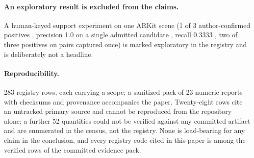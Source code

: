 \paragraph{An exploratory result is excluded from the claims.}
A human-keyed support experiment on one ARKit scene (1 of 3 author-confirmed positives
, precision 1.0 on a single admitted candidate , recall 0.3333
, two of three positives on pairs captured once) is marked exploratory in the
registry and is deliberately not a headline.

\paragraph{Reproducibility.}
283 registry rows, each carrying a scope; a sanitized pack of 23 numeric reports with
checksums and provenance accompanies the paper. Twenty-eight rows
cite an untracked primary source and cannot be reproduced from the repository alone; a
further 52 quantities could not be verified against any committed artifact and are
enumerated in the census, not the registry. None is load-bearing for any claim in the
conclusion, and every registry code cited in this paper is among the verified rows of
the committed evidence pack.

